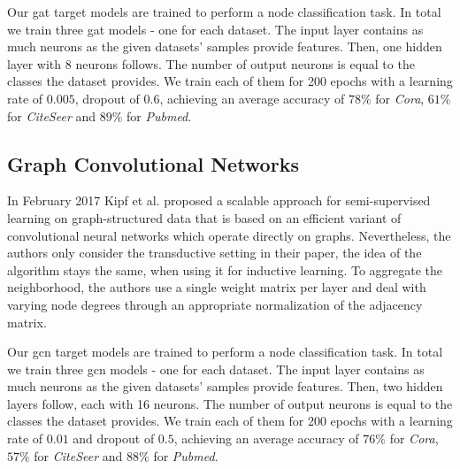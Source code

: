       Our gat target models are trained to perform a node classification task.
      In total we train three gat models - one for each dataset.
      The input layer contains as much neurons as the given datasets' samples provide features.
      Then, one hidden layer with 8 neurons follows.
      The number of output neurons is equal to the classes the dataset provides.
      We train each of them for 200 epochs with a learning rate of $0.005$, dropout of $0.6$, achieving an average accuracy of $78\%$ for \emph{Cora}, $61\%$ for \emph{CiteSeer} and $89\%$ for \emph{Pubmed}.

    \subsection*{Graph Convolutional Networks}
      In February 2017 Kipf et al. \cite{gcn} proposed a scalable approach for semi-supervised learning on graph-structured data that is based on an efficient variant of convolutional neural networks which operate directly on graphs.
      Nevertheless, the authors only consider the transductive setting in their paper, the idea of the algorithm stays the same, when using it for inductive learning.
      To aggregate the neighborhood, the authors use a single weight matrix per layer and deal with varying node degrees through an appropriate normalization of the adjacency matrix.

      Our gcn target models are trained to perform a node classification task.
      In total we train three gcn models - one for each dataset.
      The input layer contains as much neurons as the given datasets' samples provide features.
      Then, two hidden layers follow, each with 16 neurons.
      The number of output neurons is equal to the classes the dataset provides.
      We train each of them for 200 epochs with a learning rate of $0.01$ and dropout of $0.5$, achieving an average accuracy of $76\%$ for \emph{Cora}, $57\%$ for \emph{CiteSeer} and $88\%$ for \emph{Pubmed}. 

